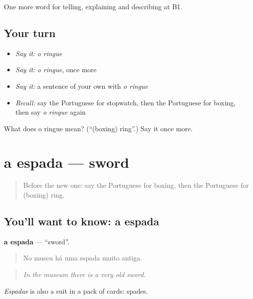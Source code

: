 \begin{grammarlens}[title={What you've built}]
One more word for telling, explaining and describing at B1.
\end{grammarlens}

\subsection*{Your turn}
\begin{itemize}
\raggedright
  \item \emph{Say it:} \emph{o ringue}
  \item \emph{Say it:} \emph{o ringue}, once more
  \item \emph{Say it:} a sentence of your own with \emph{o ringue}
  \item \emph{Recall:} say the Portuguese for stopwatch, then the Portuguese for boxing, then say \emph{o ringue} again
\end{itemize}

\begin{tcolorbox}[breakable,colback=teal!4,colframe=teal!35!black,title={Before you move on}]
What does o ringue mean? (\textquotedblleft{}(boxing) ring\textquotedblright{}.) Say it once more.
\end{tcolorbox}
\section[a espada]{a espada — sword}

\label{lesson:PT-C514-espada}



\begin{quote}
Before the new one: say the Portuguese for boxing, then the Portuguese for (boxing) ring.
\end{quote}

\subsection*{You'll want to know: a espada}
\textbf{a espada} — \textquotedblleft{}sword\textquotedblright{}.

\begin{quote}
No museu há uma espada muito antiga.
\end{quote}

\begin{quote}
\emph{In the museum there is a very old sword.}
\end{quote}

\emph{Espadas} is also a suit in a pack of cards: spades.

